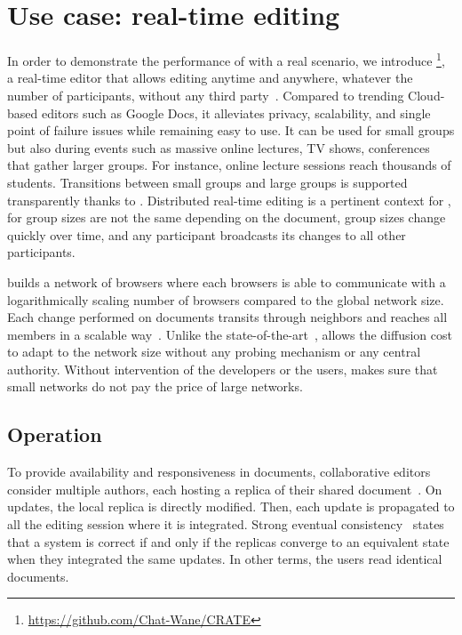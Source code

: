 
\section{Use case: real-time editing}
\label{sec:use-case}

In order to demonstrate the performance of \SPRAY with a real scenario, we
introduce \CRATE\footnote{\url{https://github.com/Chat-Wane/CRATE}}, a real-time
editor that allows editing anytime and anywhere, whatever the number of
participants, without any third party~\cite{nedelec2016crate}. Compared to
trending Cloud-based editors such as Google Docs, it alleviates privacy,
scalability, and single point of failure issues while remaining easy to use.  It
can be used for small groups but also during events such as massive online
lectures, TV shows, conferences that gather larger groups. For instance, online
lecture sessions reach thousands of students. Transitions between small groups
and large groups is supported transparently thanks to \SPRAY. Distributed
real-time editing is a pertinent context for \SPRAY, for group sizes are not the
same depending on the document, group sizes change quickly over time, and any
participant broadcasts its changes to all other participants.

\CRATE builds a network of browsers where each browsers is able to communicate
with a logarithmically scaling number of browsers compared to the global network
size. Each change performed on documents transits through neighbors and reaches
all members in a scalable way~\cite{birman1999bimodal}. Unlike the
state-of-the-art~\cite{tolgyeski2009adaptive,voulgaris2005cyclon}, \SPRAY
allows the diffusion cost to adapt to the network size without any probing
mechanism or any central authority. Without intervention of the developers or
the users, \SPRAY makes sure that small networks do not pay the price of large
networks.

\subsection{Operation}

To provide availability and responsiveness in documents, collaborative
editors consider multiple authors, each hosting a replica of their
shared document~\cite{saito2005optimistic}.  On updates, the local
replica is directly modified. Then, each update is propagated to all
the editing session where it is integrated. Strong eventual
consistency~\cite{bailis2013eventual} states that a system is correct
if and only if the replicas converge to an equivalent state when they
integrated the same updates. In other terms, the users read identical
documents.

